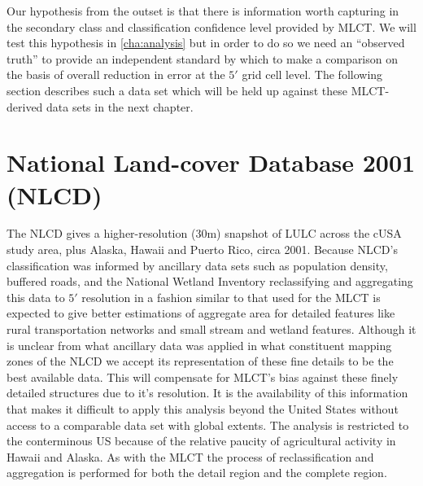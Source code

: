 Our hypothesis from the outset is that there is information worth
capturing in the secondary class and classification confidence level
provided by MLCT.  We will test this hypothesis in
\autoref{cha:analysis} but in order to do so we need an ``observed
truth'' to provide an independent standard by which to make a
comparison on the basis of overall reduction in error at the $5'$ grid
cell level.  The following section describes such a data set which
will be held up against these MLCT-derived data sets in the next
chapter.



\clearpage

\section{National Land-cover Database 2001 (NLCD)}
\label{sec:nlcd}


The NLCD gives a higher-resolution (30m) snapshot of LULC across the
cUSA study area, plus Alaska, Hawaii and Puerto Rico, circa 2001.
Because NLCD's classification was informed by ancillary data sets such
as population density, buffered roads, and the National Wetland
Inventory \citep{Homer2004} reclassifying and aggregating this data to
$5'$ resolution in a fashion similar to that used for the MLCT is
expected to give better estimations of aggregate area for detailed
features like rural transportation networks and small stream and
wetland features.  Although it is unclear from \citet{Homer2004} what
ancillary data was applied in what constituent mapping zones of the
NLCD we accept its representation of these fine details to be the best
available data.  This will compensate for MLCT's bias against these
finely detailed structures due to it's resolution.  It is the
availability of this information that makes it difficult to apply this
analysis beyond the United States without access to a comparable data
set with global extents.  The analysis is restricted to the
conterminous US because of the relative paucity of agricultural
activity in Hawaii and Alaska.  As with the MLCT the process of
reclassification and aggregation is performed for both the detail
region and the complete region.

